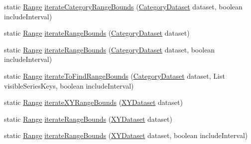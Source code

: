 \begin{DoxyCompactItemize}
\item 
static \mbox{\hyperlink{classorg_1_1jfree_1_1data_1_1_range}{Range}} \mbox{\hyperlink{classorg_1_1jfree_1_1data_1_1general_1_1_dataset_utilities_aa2fe9054ca3eacd028b16e9eadba477b}{iterate\+Category\+Range\+Bounds}} (\mbox{\hyperlink{interfaceorg_1_1jfree_1_1data_1_1category_1_1_category_dataset}{Category\+Dataset}} dataset, boolean include\+Interval)
\item 
static \mbox{\hyperlink{classorg_1_1jfree_1_1data_1_1_range}{Range}} \mbox{\hyperlink{classorg_1_1jfree_1_1data_1_1general_1_1_dataset_utilities_ab1cac3435f49ea56da0111ddd72b9ef8}{iterate\+Range\+Bounds}} (\mbox{\hyperlink{interfaceorg_1_1jfree_1_1data_1_1category_1_1_category_dataset}{Category\+Dataset}} dataset)
\item 
static \mbox{\hyperlink{classorg_1_1jfree_1_1data_1_1_range}{Range}} \mbox{\hyperlink{classorg_1_1jfree_1_1data_1_1general_1_1_dataset_utilities_ae5aa72f93c4a25f52025f5d0288de9a9}{iterate\+Range\+Bounds}} (\mbox{\hyperlink{interfaceorg_1_1jfree_1_1data_1_1category_1_1_category_dataset}{Category\+Dataset}} dataset, boolean include\+Interval)
\item 
static \mbox{\hyperlink{classorg_1_1jfree_1_1data_1_1_range}{Range}} \mbox{\hyperlink{classorg_1_1jfree_1_1data_1_1general_1_1_dataset_utilities_ae81934690eb5c0dac9c8200058a663be}{iterate\+To\+Find\+Range\+Bounds}} (\mbox{\hyperlink{interfaceorg_1_1jfree_1_1data_1_1category_1_1_category_dataset}{Category\+Dataset}} dataset, List visible\+Series\+Keys, boolean include\+Interval)
\item 
static \mbox{\hyperlink{classorg_1_1jfree_1_1data_1_1_range}{Range}} \mbox{\hyperlink{classorg_1_1jfree_1_1data_1_1general_1_1_dataset_utilities_a4d990430f5d54efb0ad828b17abb9aa3}{iterate\+X\+Y\+Range\+Bounds}} (\mbox{\hyperlink{interfaceorg_1_1jfree_1_1data_1_1xy_1_1_x_y_dataset}{X\+Y\+Dataset}} dataset)
\item 
static \mbox{\hyperlink{classorg_1_1jfree_1_1data_1_1_range}{Range}} \mbox{\hyperlink{classorg_1_1jfree_1_1data_1_1general_1_1_dataset_utilities_a27af79e63906c96f8420bb5dcdd8b479}{iterate\+Range\+Bounds}} (\mbox{\hyperlink{interfaceorg_1_1jfree_1_1data_1_1xy_1_1_x_y_dataset}{X\+Y\+Dataset}} dataset)
\item 
static \mbox{\hyperlink{classorg_1_1jfree_1_1data_1_1_range}{Range}} \mbox{\hyperlink{classorg_1_1jfree_1_1data_1_1general_1_1_dataset_utilities_a61799a470b2eeaab266d942b23b71b97}{iterate\+Range\+Bounds}} (\mbox{\hyperlink{interfaceorg_1_1jfree_1_1data_1_1xy_1_1_x_y_dataset}{X\+Y\+Dataset}} dataset, boolean include\+Interval)

\end{DoxyCompactItemize}
